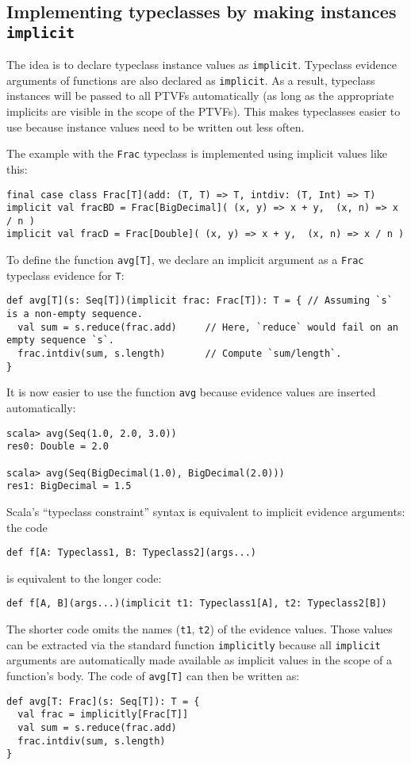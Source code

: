 \subsection{Implementing typeclasses by making instances \texttt{implicit} }

The idea is to declare typeclass instance values as \lstinline!implicit!.
Typeclass evidence arguments of functions are also declared as \lstinline!implicit!.
As a result, typeclass instances will be passed to all PTVFs automatically
(as long as the appropriate implicits are visible in the scope of
the PTVFs). This makes typeclasses easier to use because instance
values need to be written out less often.

The example with the \lstinline!Frac! typeclass is implemented using
implicit values like this:
\begin{lstlisting}
final case class Frac[T](add: (T, T) => T, intdiv: (T, Int) => T)
implicit val fracBD = Frac[BigDecimal]( (x, y) => x + y,  (x, n) => x / n )
implicit val fracD = Frac[Double]( (x, y) => x + y,  (x, n) => x / n )
\end{lstlisting}
To define the function \lstinline!avg[T]!, we declare an implicit
argument as a \lstinline!Frac! typeclass evidence for \lstinline!T!:
\begin{lstlisting}
def avg[T](s: Seq[T])(implicit frac: Frac[T]): T = { // Assuming `s` is a non-empty sequence.
  val sum = s.reduce(frac.add)     // Here, `reduce` would fail on an empty sequence `s`.
  frac.intdiv(sum, s.length)       // Compute `sum/length`.
}
\end{lstlisting}
It is now easier to use the function \lstinline!avg! because evidence
values are inserted automatically:
\begin{lstlisting}
scala> avg(Seq(1.0, 2.0, 3.0))
res0: Double = 2.0

scala> avg(Seq(BigDecimal(1.0), BigDecimal(2.0)))
res1: BigDecimal = 1.5
\end{lstlisting}

Scala\textsf{'}s \textsf{``}typeclass constraint\textsf{''} syntax is equivalent to implicit
evidence arguments: the code
\begin{lstlisting}
def f[A: Typeclass1, B: Typeclass2](args...)
\end{lstlisting}
is equivalent to the longer code:
\begin{lstlisting}
def f[A, B](args...)(implicit t1: Typeclass1[A], t2: Typeclass2[B])
\end{lstlisting}
The shorter code omits the names (\lstinline!t1!, \lstinline!t2!)
of the evidence values. Those values can be extracted via the standard
function \lstinline!implicitly! because all \lstinline!implicit!
arguments are automatically made available as implicit values in the
scope of a function\textsf{'}s body. The code of \lstinline!avg[T]! can then
be written as:
\begin{lstlisting}
def avg[T: Frac](s: Seq[T]): T = {
  val frac = implicitly[Frac[T]]
  val sum = s.reduce(frac.add)
  frac.intdiv(sum, s.length)
}
\end{lstlisting}

